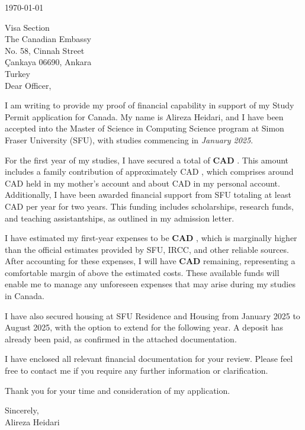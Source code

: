 \thispagestyle{plain}

\noindent
\today

\noindent
Visa Section \\
The Canadian Embassy \\
No. 58, Cinnah Street \\
Çankaya 06690, Ankara \\
Turkey \\

Dear Officer,

I am writing to provide my proof of financial capability in support of my Study Permit application for Canada. My name is Alireza Heidari, and I have been accepted into the Master of Science in Computing Science program at Simon Fraser University (SFU), with studies commencing in \textit{January 2025}.

For the first year of my studies, I have secured a total of \textbf{CAD {\totalFunds}}. This amount includes a family contribution of approximately CAD {\sponsorFunds}, which comprises around CAD {\sponsorFunds} held in my mother's account and about CAD {\selfFunds} in my personal account. Additionally, I have been awarded financial support from SFU totaling at least CAD {\universityFunds} per year for two years. This funding includes scholarships, research funds, and teaching assistantships, as outlined in my admission letter. 

I have estimated my first-year expenses to be \textbf{CAD {\totalExpenses}}, which is marginally higher than the official estimates provided by SFU, IRCC, and other reliable sources. After accounting for these expenses, I will have \textbf{CAD {\remainingFunds}} remaining, representing a comfortable margin of \textbf{{\remainingFundsToExpensesPercentage}} above the estimated costs. These available funds will enable me to manage any unforeseen expenses that may arise during my studies in Canada.

I have also secured housing at SFU Residence and Housing from January 2025 to August 2025, with the option to extend for the following year. A deposit has already been paid, as confirmed in the attached documentation.

I have enclosed all relevant financial documentation for your review. Please feel free to contact me if you require any further information or clarification.

Thank you for your time and consideration of my application.

\noindent
Sincerely,\\
Alireza Heidari

\clearpage
